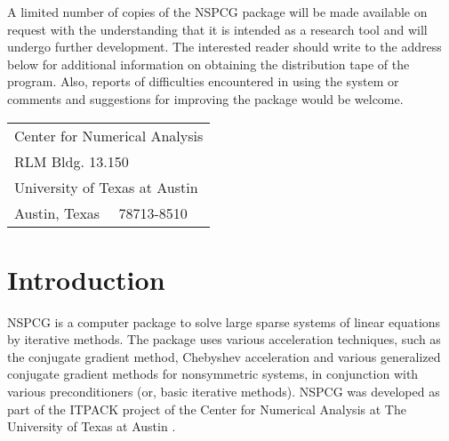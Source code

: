    A limited number of copies of the NSPCG package will be made available
on request with the understanding that it is intended as a research tool
and will undergo further development.  The interested reader should write
to the address below for additional information on obtaining the 
distribution tape of the program.  Also, reports of difficulties encountered
in using the system or comments and suggestions for improving the package 
would be welcome.
\bigskip

\begin{tabular}{l}
Center for Numerical Analysis \\
RLM Bldg. 13.150 \\
University of Texas at Austin \\
Austin, Texas \ \ 78713-8510 
\end{tabular}
\newpage
\tableofcontents
\newpage
\listoftables
\newpage
\section{Introduction}
\label{intro}
\indent
 
   NSPCG is a computer package to solve large sparse systems of linear
equations by iterative methods.  The package uses various acceleration
techniques, such as the conjugate gradient method, Chebyshev
acceleration and various generalized conjugate gradient methods for
nonsymmetric systems, in conjunction with various preconditioners
(or, basic iterative methods).  NSPCG was developed as part of the ITPACK
project of the Center for Numerical Analysis at The University of Texas
at Austin \cite{itpackv2c,itpack2c,future}.
\smallskip
 
